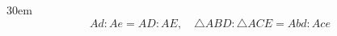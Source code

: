 \documentclass[border=4pt]{standalone}
\begin{document}
\begin{varwidth}{30em}
\large
\[ Ad:Ae = AD:AE,\quad \triangle ABD:\triangle ACE = Abd:Ace \]

\end{varwidth}
\end{document}
